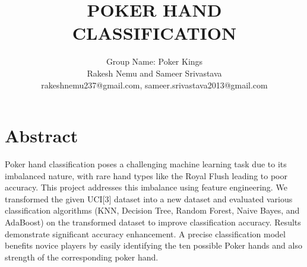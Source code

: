 \documentclass[11pt, oneside]{article}   	%
\title{POKER HAND CLASSIFICATION}
\author{Group Name: Poker Kings\\
Rakesh Nemu and Sameer Srivastava\\
rakeshnemu237@gmail.com, sameer.srivastava2013@gmail.com}
\begin{document}
\maketitle

\section*{Abstract}

Poker hand classification poses a challenging machine learning task due to its imbalanced nature, with rare hand types like the Royal Flush leading to poor accuracy. This project addresses this imbalance using feature engineering. We transformed the given \uppercase{UCI}[3] dataset into a new dataset and evaluated various classification algorithms (KNN, Decision Tree, Random Forest, Naive Bayes, and AdaBoost) on the transformed dataset to improve classification accuracy. Results demonstrate significant accuracy enhancement. A precise classification model benefits novice players by easily identifying the ten possible Poker hands and also strength of the corresponding poker hand.
\end{document}
